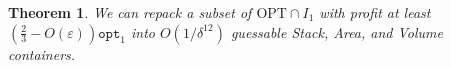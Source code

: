 \documentclass[10pt,a4paper]{amsart}
\newcommand{\ari}[1]{#1}
\newcommand{\djr}[1]{}
\renewcommand{\epsilon}{\varepsilon} %
\newtheorem{theorem}{Theorem}[section]
\theoremstyle{definition}
\newcommand{\opt}{\mathtt{opt}}
\begin{document}


\begin{theorem}
\label{thm:guessableconfig}
    We can repack a subset of $\text{OPT}\cap I_1$ with profit at least $\left(\frac{2}{3}-O(\epsilon)\right)\opt_1$ into \ari{$O(1/{\delta^{12}})$} guessable Stack, Area, and Volume containers. 
\end{theorem}
\end{document}
